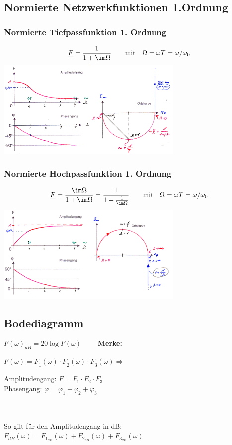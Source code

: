 	\subsection{Normierte Netzwerkfunktionen 1.Ordnung}
	\begin{multicols}{2} 
		\subsubsection{Normierte Tiefpassfunktion 1. Ordnung}
		\[ \underline{F} = \dfrac{1}{1 + \im \Omega} \qquad \text{mit} \quad \Omega = \omega T = \omega/\omega_0\]
		\includegraphics[width=9cm]{./images/freq-norm-TP-1Ordnung}
	\columnbreak
		\subsubsection{Normierte Hochpassfunktion 1. Ordnung}
		\[ \underline{F} = \dfrac{\im \Omega}{1 + \im \Omega} = \dfrac{1}{1 + \frac{1}{\im \Omega}} \qquad \text{mit} \quad \Omega = \omega T = \omega/\omega_0\]
		\includegraphics[width=9cm]{./images/freq-norm-HP-1Ordnung}
	\end{multicols}
	
	\subsection{Bodediagramm}
	
	$\boxed{F(\omega)_{dB} = 20 \log F(\omega)} \qquad$
	\textbf{Merke:  } 
	\begin{minipage}{12cm}
		$\underline{F}(\omega) = \underline{F}_1(\omega)\cdot \underline{F}_2(\omega)\cdot \underline{F}_3(\omega) \Rightarrow$
		\parbox{8cm}{Amplitudengang: $ F = F_1\cdot F_2 \cdot F_3$\\
		Phasengang: $\varphi = \varphi_1 + \varphi_2 + \varphi_3$ }\\ \\
		So gilt für den Amplitudengang in dB: 
		$F_{dB}(\omega) = F_{1_{dB}}(\omega) +  F_{2_{dB}}(\omega) + F_{3_{dB}}(\omega)$
	\end{minipage}\\
	
